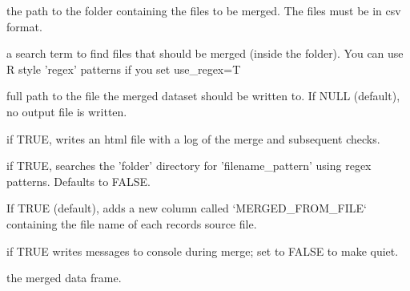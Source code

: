 \documentclass[a4paper]{book}
\begin{document}
\begin{Arguments}
\begin{ldescription}
\item[\code{folder}] the path to the folder containing the files to be merged. The files must be in csv format.

\item[\code{filename\_pattern}] a search term to find files that should be merged (inside the folder). You can use R style 'regex' patterns if you set use\_regex=T

\item[\code{output\_file}] full path to the file the merged dataset should be written to. If NULL (default), no output file is written.

\item[\code{write\_log}] if TRUE, writes an html file with a log of the merge and subsequent checks.

\item[\code{use\_regex}] if TRUE, searches the 'folder' directory for 'filename\_pattern' using regex patterns. Defaults to FALSE.

\item[\code{add\_file\_reference}] If TRUE (default), adds a new column called `MERGED\_FROM\_FILE` containing the file name of each records source file.

\item[\code{verbose}] if TRUE writes messages to console during merge; set to FALSE to make quiet.
\end{ldescription}
\end{Arguments}
%
\begin{Value}
the merged data frame.
\end{Value}
\printindex{}
\end{document}
